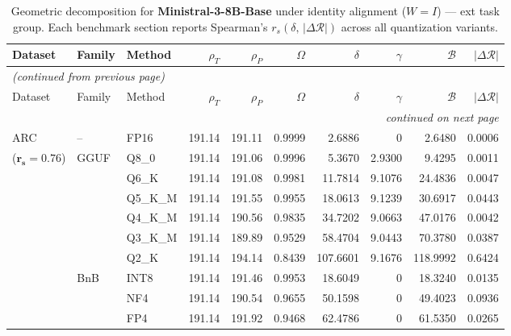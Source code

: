 \begingroup
\small
\setlength{\tabcolsep}{4pt}
\renewcommand{\arraystretch}{1.05}
\setlength{\LTcapwidth}{\textwidth}
\begin{longtable}{ll l rrrrrrr}
\caption{Geometric decomposition for \textbf{Ministral-3-8B-Base} under identity alignment ($W{=}I$) --- ext task group. Each benchmark section reports Spearman's $r_s(\delta,\,|\Delta\mathcal{R}|)$ across all quantization variants.}\label{tab:mistral_decomposition_ext}\\
\toprule
Dataset & Family & Method & $\rho_T$ & $\rho_P$ & $\Omega$ & $\delta$ & $\gamma$ & $\mathcal{B}$ & $|\Delta\mathcal{R}|$ \\
\midrule
\endfirsthead
\multicolumn{10}{l}{\small\itshape (continued from previous page)}\\
\toprule
Dataset & Family & Method & $\rho_T$ & $\rho_P$ & $\Omega$ & $\delta$ & $\gamma$ & $\mathcal{B}$ & $|\Delta\mathcal{R}|$ \\
\midrule
\endhead
\midrule
\multicolumn{10}{r}{\small\itshape continued on next page}\\
\endfoot
\bottomrule
\endlastfoot
ARC & -- & FP16 & 191.14 & 191.11 & 0.9999 & 2.6886 & \cellcolor{cyan!12} $0$ & 2.6480 & 0.0006 \\
{\small ($\mathbf{r_s{=}0.76}$)} & GGUF & Q8\_0 & 191.14 & 191.06 & 0.9996 & 5.3670 & 2.9300 & 9.4295 & 0.0011 \\
 &  & Q6\_K & 191.14 & 191.08 & 0.9981 & 11.7814 & 9.1076 & 24.4836 & 0.0047 \\
 &  & Q5\_K\_M & 191.14 & 191.55 & 0.9955 & 18.0613 & 9.1239 & 30.6917 & 0.0443 \\
 &  & Q4\_K\_M & 191.14 & 190.56 & 0.9835 & 34.7202 & 9.0663 & 47.0176 & 0.0042 \\
 &  & Q3\_K\_M & 191.14 & 189.89 & 0.9529 & 58.4704 & 9.0443 & 70.3780 & 0.0387 \\
 &  & Q2\_K & 191.14 & 194.14 & \cellcolor{red!18} 0.8439 & \cellcolor{red!18} 107.6601 & 9.1676 & \cellcolor{red!18} 118.9992 & \cellcolor{red!18} 0.6424 \\
 & BnB & INT8 & 191.14 & 191.46 & 0.9953 & 18.6049 & \cellcolor{cyan!12} $0$ & 18.3240 & 0.0135 \\
 &  & NF4 & 191.14 & 190.54 & 0.9655 & 50.1598 & \cellcolor{cyan!12} $0$ & 49.4023 & 0.0936 \\
 &  & FP4 & 191.14 & 191.92 & \cellcolor{red!18} 0.9468 & \cellcolor{red!18} 62.4786 & \cellcolor{cyan!12} $0$ & \cellcolor{red!18} 61.5350 & \cellcolor{red!18} 0.0265 \\

\end{longtable}
